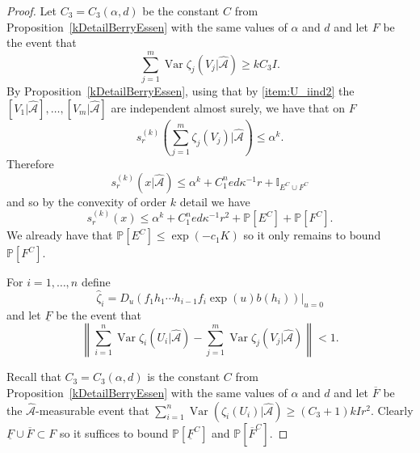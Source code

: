 \documentclass[10pt, english,oneside,reqno]{amsart}
\theoremstyle{plain}
\theoremstyle{remark}
\numberwithin{equation}{section}
\numberwithin{figure}{section}
\DeclareMathOperator{\var}{Var}
\begin{document}
\begin{proof}
    Let $C_3 = C_3(\alpha, d)$ be the constant $C$ from Proposition~\ref{kDetailBerryEssen} with the same values of $\alpha$ and $d$ and let $F$ be the event that $$\sum_{j=1}^m \var \zeta_j(V_j|\hat{\mathscr{A}}) \geq k C_3 I.$$ By Proposition~\ref{kDetailBerryEssen}, using that by \ref{item:U_iind2} the $[V_1|\hat{\mathscr{A}}], \ldots ,[V_m|\hat{\mathscr{A}}]$ are independent almost surely, we have that on $F$ $$s_r^{(k)}\left(\sum_{j=1}^m \zeta_j(V_j) | \hat{\mathscr{A}}\right) \leq \alpha^k.$$ Therefore
    \begin{equation*}
        s_r^{(k)}(x|\hat{\mathscr{A}}) \leq \alpha^k + C_1^n ed \kappa^{-1} r + \mathbb{I}_{E^C \cup F^C}
    \end{equation*}
    and so by the convexity of order $k$ detail we have
    \begin{equation*}
        s_r^{(k)}(x) \leq \alpha^k + C_1^n ed \kappa^{-1} r^2 + \mathbb{P}[E^C] + \mathbb{P}[F^C]. \label{eq:decomposition_order_k_detail_estimate}
    \end{equation*}
    We already have that $\mathbb{P}[E^C] \leq \exp(-c_1 K)$ so it only remains to bound $\mathbb{P}[F^C]$.

    For $i=1, \dots, n$ define $$\hat{\zeta}_i = D_u(f_1 h_1 \cdots h_{i-1}f_i \exp(u) b(h_i))|_{u=0}$$ and let $\underline{F}$ be the event that
    \begin{equation*}
        \left\| \sum_{i=1}^{n} \var \hat{\zeta}_i(U_i|\hat{\mathscr{A}}) - \sum_{j=1}^m \var \zeta_j(V_j|\hat{\mathscr{A}}) \right\| < 1.
    \end{equation*}

    Recall that $C_3 = C_3(\alpha, d)$ is the constant $C$ from Proposition~\ref{kDetailBerryEssen} with the same values of $\alpha$ and $d$ and let $\overline{F}$ be the $\hat{\mathscr{A}}$-measurable event that $\sum_{i=1}^{n} \var(\hat{\zeta}_i(U_i)|\hat{\mathscr{A}}) \geq (C_3 + 1) k I r^2$. Clearly $\underline{F} \cup \overline{F} \subset F$ so it suffices to bound $\mathbb{P}[\underline{F}^C]$ and $\mathbb{P}[\overline{F}^C]$.


\end{proof}
\end{document}
